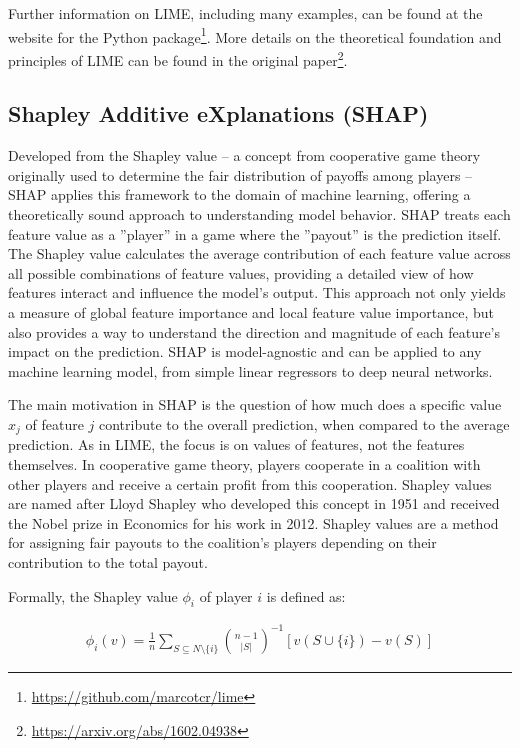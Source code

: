 \begin{tcolorbox}[colback=code]
\small
Further information on LIME, including many examples, can be found at the website for the Python package\footnote{\url{https://github.com/marcotcr/lime}}. More details on the theoretical foundation and principles of LIME can be found in the original paper\footnote{\url{https://arxiv.org/abs/1602.04938}}.
\normalsize
\end{tcolorbox}

\subsection{Shapley Additive eXplanations (SHAP)}

Developed from the Shapley value -- a concept from cooperative game theory originally used to determine the fair distribution of payoffs among players -- SHAP applies this framework to the domain of machine learning, offering a theoretically sound approach to understanding model behavior. SHAP treats each feature value as a ''player'' in a game where the ''payout'' is the prediction itself. The Shapley value calculates the average contribution of each feature value across all possible combinations of feature values, providing a detailed view of how features interact and influence the model's output. This approach not only yields a measure of global feature importance and local feature value importance, but also provides a way to understand the direction and magnitude of each feature's impact on the prediction. SHAP is model-agnostic and can be applied to any machine learning model, from simple linear regressors to deep neural networks. 

The main motivation in SHAP is the question of how much does a specific value $x_j$ of feature $j$ contribute to the overall prediction, when compared to the average prediction. As in LIME, the focus is on values of features, not the features themselves. In cooperative game theory, players cooperate in a coalition with other players and receive a certain profit from this cooperation. Shapley values are named after Lloyd Shapley who developed this concept in 1951 and received the Nobel prize in Economics for his work in 2012. Shapley values are a method for assigning fair payouts to the coalition's players depending on their contribution to the total payout. 

Formally, the Shapley value $\phi_i$ of player $i$ is defined as:

\begin{align*}
\phi_i(v) = \frac{1}{n} \sum_{S \subseteq N \setminus \{i\}} \binom{n-1}{|S|}^{-1} \left[ v(S \cup \{i\}) - v(S)\right]
\end{align*}

